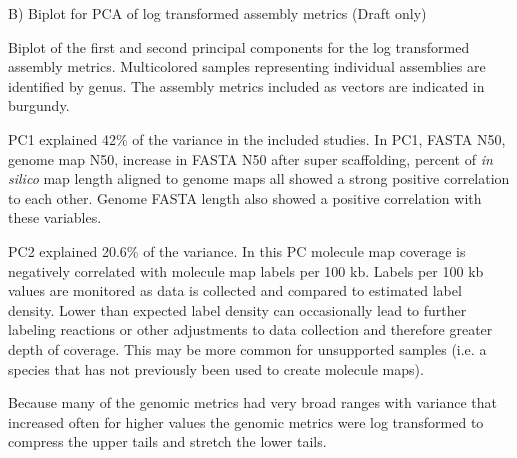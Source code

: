 B) Biplot for PCA of log transformed assembly metrics (Draft only)

Biplot of the first and second principal components for the log transformed assembly metrics. Multicolored samples representing individual assemblies are identified by genus. The assembly metrics included as vectors are indicated in burgundy.

PC1 explained 42\% of the variance in the included studies. In PC1, FASTA N50, genome map N50, increase in FASTA N50 after super scaffolding, percent of \textit{in silico} map length aligned to genome maps all showed a strong positive correlation to each other. Genome FASTA length also showed a positive correlation with these variables.

PC2 explained 20.6\% of the variance. In this PC molecule map coverage is negatively correlated with molecule map labels per 100 kb. Labels per 100 kb values are monitored as data is collected and compared to estimated label density. Lower than expected label density can occasionally lead to further labeling reactions or other adjustments to data collection and therefore greater depth of coverage. This may be more common for unsupported samples (i.e. a species that has not previously been used to create molecule maps).

Because many of the genomic metrics had very broad ranges with variance that increased often for higher values the genomic metrics were log transformed to compress the upper tails and stretch the lower tails.

